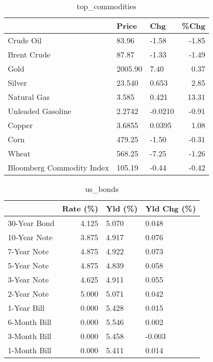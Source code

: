 \documentclass{article}%
\begin{document}
\begin{table}[htbp]%
\caption{top\_commodities}%
\centering%
\begin{adjustbox}{width=1\textwidth}%
\begin{tabular}{lllr}
\toprule
                          &   Price &     Chg &  \%Chg \\
\midrule
               Crude Oil  &   83.96 &   -1.58 & -1.85 \\
             Brent Crude  &   87.87 &   -1.33 & -1.49 \\
                    Gold  & 2005.90 &    7.40 &  0.37 \\
                  Silver  &  23.540 &   0.653 &  2.85 \\
             Natural Gas  &   3.585 &   0.421 & 13.31 \\
       Unleaded Gasoline  &  2.2742 & -0.0210 & -0.91 \\
                  Copper  &  3.6855 &  0.0395 &  1.08 \\
                    Corn  &  479.25 &   -1.50 & -0.31 \\
                   Wheat  &  568.25 &   -7.25 & -1.26 \\
Bloomberg Commodity Index &  105.19 &   -0.44 & -0.42 \\
\bottomrule
\end{tabular}
%
\end{adjustbox}%
\end{table}

%


\begin{table}[htbp]%
\caption{us\_bonds}%
\centering%
\begin{adjustbox}{width=1\textwidth}%
\begin{tabular}{lrll}
\toprule
             &  Rate (\%) & Yld (\%) & Yld Chg (\%) \\
\midrule
30-Year Bond &     4.125 &   5.070 &       0.048 \\
10-Year Note &     3.875 &   4.917 &       0.076 \\
 7-Year Note &     4.875 &   4.922 &       0.073 \\
 5-Year Note &     4.875 &   4.839 &       0.058 \\
 3-Year Note &     4.625 &   4.911 &       0.055 \\
 2-Year Note &     5.000 &   5.071 &       0.042 \\
 1-Year Bill &     0.000 &   5.428 &       0.015 \\
6-Month Bill &     0.000 &   5.546 &       0.002 \\
3-Month Bill &     0.000 &   5.458 &      -0.003 \\
1-Month Bill &     0.000 &   5.411 &       0.014 \\
\bottomrule
\end{tabular}
%
\end{adjustbox}%
\end{table}
\end{document}

